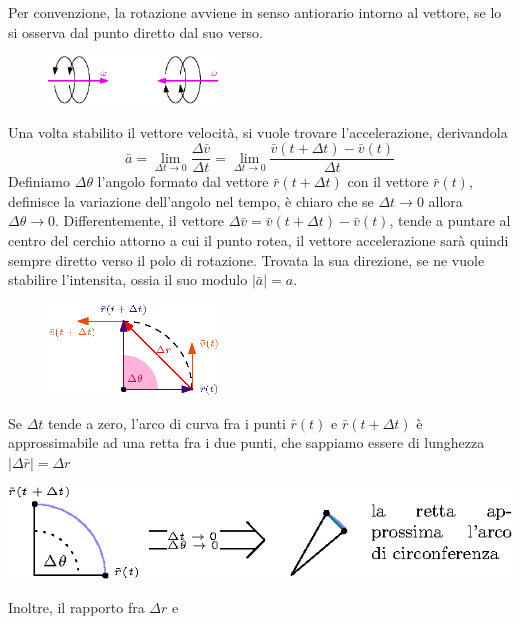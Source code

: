 \documentclass[10pt, letterpaper]{report}
\begin{document}
Per convenzione, la rotazione avviene in senso antiorario intorno al vettore, se lo si osserva dal punto 
diretto dal suo verso.\begin{center}
    \begin{figure}[h!]
        \centering
        \includegraphics[width=0.4\textwidth]{images/dirVetAng.eps}
    \end{figure} 
\end{center}
Una volta stabilito il vettore velocità, si vuole trovare l'accelerazione, derivandola 
$$ \bar a = \lim_{\Delta t\rightarrow 0}\dfrac{\Delta \bar v}{\Delta t}
= \lim_{\Delta t\rightarrow 0}\dfrac{\bar v(t+\Delta t)-\bar v(t)}{\Delta t}$$
Definiamo $\Delta \theta$ l'angolo formato dal vettore $\bar r(t+\Delta t)$ con il vettore 
$\bar r(t)$, definisce la variazione dell'angolo nel tempo, è chiaro che se 
$\Delta t\rightarrow 0$ allora $\Delta \theta\rightarrow 0$.\acc 
Differentemente, il vettore $\Delta \bar v=\bar v(t+\Delta t)-\bar v(t)$, tende a puntare 
al centro del cerchio attorno a cui il punto rotea, il vettore accelerazione sarà quindi sempre diretto verso il polo di rotazione. Trovata la sua direzione, se ne vuole 
stabilire l'intensita, ossia il suo modulo $|\bar a|=a$.
\begin{center}
    \begin{figure}[h!]
        \centering
        \includegraphics[width=0.4\textwidth]{images/accAng.eps}
    \end{figure} 
\end{center}
Se $\Delta t$ tende a zero, l'arco di curva fra i punti $\bar r(t)$ e $\bar r(t+\Delta t)$ è approssimabile ad una retta fra i due punti, che 
sappiamo essere di lunghezza $|\Delta \bar r|=\Delta r$\begin{center}
    \includegraphics[width=1\textwidth]{images/arcoApprossimaRetta.eps}
\end{center}Inoltre, il rapporto fra $\Delta r$ e 
\end{document}
